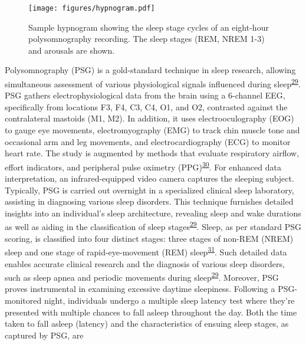 \documentclass[
  9pt,
]{scrbook}
\begin{document}
\begin{figure}

{\centering \texttt{[image: figures/hypnogram.pdf]}

}

\caption{\label{fig-hypno}Sample hypnogram showing the sleep stage
cycles of an eight-hour polysomnography recording. The sleep stages
(REM, NREM 1-3) and arousals are shown.}

\end{figure}

Polysomnography (PSG) is a gold-standard technique in sleep research,
allowing simultaneous assessment of various physiological signals
influenced during
sleep\textsuperscript{\protect\hyperlink{ref-sadeh_2015}{29}}. PSG
gathers electrophysiological data from the brain using a 6-channel EEG,
specifically from locations F3, F4, C3, C4, O1, and O2, contrasted
against the contralateral mastoids (M1, M2). In addition, it uses
electrooculography (EOG) to gauge eye movements, electromyography (EMG)
to track chin muscle tone and occasional arm and leg movements, and
electrocardiography (ECG) to monitor heart rate. The study is augmented
by methods that evaluate respiratory airflow, effort indicators, and
peripheral pulse oximetry
(PPG)\textsuperscript{\protect\hyperlink{ref-ibuxe1uxf1ez_2018}{30}}.
For enhanced data interpretation, an infrared-equipped video camera
captures the sleeping subject. Typically, PSG is carried out overnight
in a specialized clinical sleep laboratory, assisting in diagnosing
various sleep disorders. This technique furnishes detailed insights into
an individual's sleep architecture, revealing sleep and wake durations
as well as aiding in the classification of sleep
stages\textsuperscript{\protect\hyperlink{ref-sadeh_2015}{29}}. Sleep,
as per standard PSG scoring, is classified into four distinct stages:
three stages of non-REM (NREM) sleep and one stage of rapid-eye-movement
(REM) sleep\textsuperscript{\protect\hyperlink{ref-roebuck_2014}{31}}.
Such detailed data enables accurate clinical research and the diagnosis
of various sleep disorders, such as sleep apnea and periodic movements
during sleep\textsuperscript{\protect\hyperlink{ref-sadeh_2015}{29}}.
Moreover, PSG proves instrumental in examining excessive daytime
sleepiness. Following a PSG-monitored night, individuals undergo a
multiple sleep latency test where they're presented with multiple
chances to fall asleep throughout the day. Both the time taken to fall
asleep (latency) and the characteristics of ensuing sleep stages, as
captured by PSG, are
\end{document}
